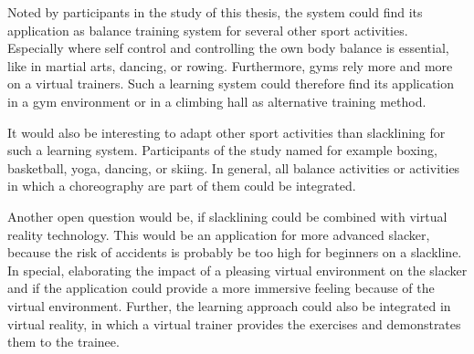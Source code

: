Noted by participants in the study of this thesis, the system could find its application as balance training system for several other sport activities.
Especially where self control and controlling the own body balance is essential, like in martial arts, dancing, or rowing.
Furthermore, gyms rely more and more on a virtual trainers.
Such a learning system could therefore find its application in a gym environment or in a climbing hall as alternative training method.

It would also be interesting to adapt other sport activities than slacklining for such a learning system.
Participants of the study named for example boxing, basketball, yoga, dancing, or skiing.
In general, all balance activities or activities in which a choreography are part of them could be integrated.

Another open question would be, if slacklining could be combined with virtual reality technology.
This would be an application for more advanced slacker, because the risk of accidents is probably be too high for beginners on a slackline.
In special, elaborating the impact of a pleasing virtual environment on the slacker and if the application could provide a more immersive feeling because of the virtual environment.
Further, the learning approach could also be integrated in virtual reality, in which a virtual trainer provides the exercises and demonstrates them to the trainee.

% 


